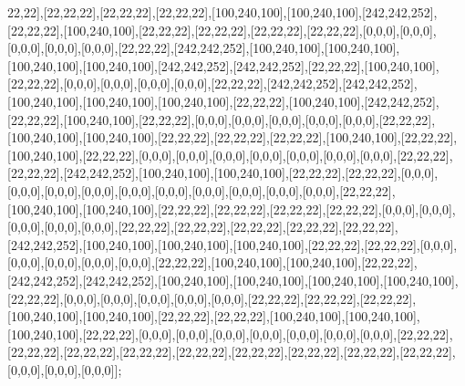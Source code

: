 22,22],[22,22,22],[22,22,22],[22,22,22],[100,240,100],[100,240,100],[242,242,252],[22,22,22],[100,240,100],[22,22,22],[22,22,22],[22,22,22],[22,22,22],[0,0,0],[0,0,0],[0,0,0],[0,0,0],[0,0,0],[22,22,22],[242,242,252],[100,240,100],[100,240,100],[100,240,100],[100,240,100],[242,242,252],[242,242,252],[22,22,22],[100,240,100],[22,22,22],[0,0,0],[0,0,0],[0,0,0],[0,0,0],[22,22,22],[242,242,252],[242,242,252],[100,240,100],[100,240,100],[100,240,100],[22,22,22],[100,240,100],[242,242,252],[22,22,22],[100,240,100],[22,22,22],[0,0,0],[0,0,0],[0,0,0],[0,0,0],[0,0,0],[22,22,22],[100,240,100],[100,240,100],[22,22,22],[22,22,22],[22,22,22],[100,240,100],[22,22,22],[100,240,100],[22,22,22],[0,0,0],[0,0,0],[0,0,0],[0,0,0],[0,0,0],[0,0,0],[0,0,0],[22,22,22],[22,22,22],[242,242,252],[100,240,100],[100,240,100],[22,22,22],[22,22,22],[0,0,0],[0,0,0],[0,0,0],[0,0,0],[0,0,0],[0,0,0],[0,0,0],[0,0,0],[0,0,0],[0,0,0],[22,22,22],[100,240,100],[100,240,100],[22,22,22],[22,22,22],[22,22,22],[22,22,22],[0,0,0],[0,0,0],[0,0,0],[0,0,0],[0,0,0],[22,22,22],[22,22,22],[22,22,22],[22,22,22],[22,22,22],[242,242,252],[100,240,100],[100,240,100],[100,240,100],[22,22,22],[22,22,22],[0,0,0],[0,0,0],[0,0,0],[0,0,0],[0,0,0],[22,22,22],[100,240,100],[100,240,100],[22,22,22],[242,242,252],[242,242,252],[100,240,100],[100,240,100],[100,240,100],[100,240,100],[22,22,22],[0,0,0],[0,0,0],[0,0,0],[0,0,0],[0,0,0],[22,22,22],[22,22,22],[22,22,22],[100,240,100],[100,240,100],[22,22,22],[22,22,22],[100,240,100],[100,240,100],[100,240,100],[22,22,22],[0,0,0],[0,0,0],[0,0,0],[0,0,0],[0,0,0],[0,0,0],[0,0,0],[22,22,22],[22,22,22],[22,22,22],[22,22,22],[22,22,22],[22,22,22],[22,22,22],[22,22,22],[22,22,22],[0,0,0],[0,0,0],[0,0,0]];

